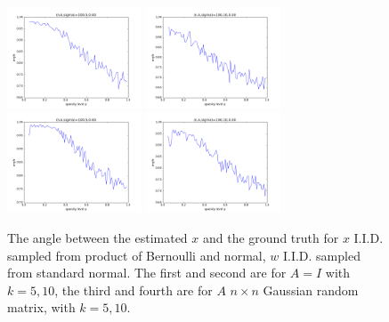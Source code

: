 \documentclass[letter, 10pt]{article}
\numberwithin{equation}{section}
\begin{document}
\begin{figure}
\includegraphics[width=4cm,keepaspectratio]{fig/w_Norm_x_BerNorm_A_Gauss_n100_k5_p__sigma0_00.png}
 \includegraphics[width=4cm,keepaspectratio]{fig/w_Norm_x_BerNorm_A_Gauss_n100_k10_p__sigma0_00.png}
\includegraphics[width=4cm,keepaspectratio]{fig/w_Norm_x_BerNorm_A_none_n100_k5_p__sigma0_00.png}
\includegraphics[width=4cm,keepaspectratio]{fig/w_Norm_x_BerNorm_A_none_n100_k10_p__sigma0_00.png}
\caption{The angle between the estimated $x$ and the ground truth for $x$ I.I.D. sampled from product of Bernoulli and normal, $w$ I.I.D. sampled from standard normal. The first and second are for $A=I$ with $k=5,10$, the third and fourth are for $A$ $n\times n$ Gaussian random matrix, with $k=5,10$.   }
\end{figure}









{\small


}
\end{document}
